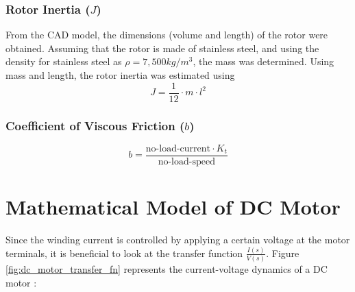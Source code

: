 \documentclass{report}
\begin{document}
\subsubsection{Rotor Inertia ($J$)}
From the CAD model, the dimensions (volume and length) of the rotor were obtained. Assuming that the rotor is made of stainless steel, and using the density for stainless steel as $\rho = 7,500 kg/m^3$, the mass was determined. Using mass and length, the rotor inertia was estimated using
\begin{equation}
J = \frac{1}{12} \cdot m \cdot l^2
\end{equation}

\subsubsection{Coefficient of Viscous Friction ($b$)}
\begin{equation}
b = \frac{\text{no-load-current} \cdot K_t}{\text{no-load-speed}}
\end{equation}




\section{Mathematical Model of DC Motor}	\label{sec:math_model}

Since the winding current is controlled by applying a certain voltage at the motor terminals, it is beneficial to look at the transfer function $\frac{I(s)}{V(s)}$. Figure \ref{fig:dc_motor_transfer_fn} represents the current-voltage dynamics of a DC motor \cite{motor_control_umich_lecture}:\\
\end{document}

